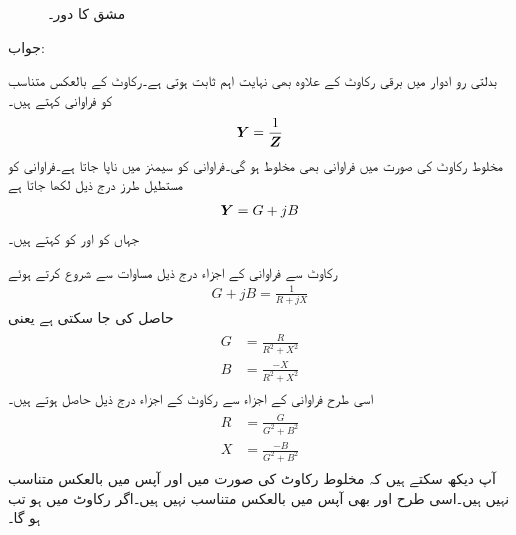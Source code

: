 \begin{figure}
\centering
{}
\caption{مشق  کا دور۔}
\label{شکل_بدلتا_متوازی_الف}
\end{figure} 

جواب:

بدلتی رو ادوار میں برقی رکاوٹ  کے علاوہ   بھی نہایت اہم ثابت ہوتی ہے۔رکاوٹ کے بالعکس متناسب کو فراوانی کہتے ہیں۔
\begin{align}
{\ensuremath{{\boldsymbol{Y}}}}=\frac{1}{{{\boldsymbol{Z}}}}
\end{align}
مخلوط رکاوٹ کی صورت میں فراوانی بھی مخلوط ہو گی۔فراوانی کو سیمنز  میں ناپا جاتا ہے۔فراوانی کو مستطیل طرز درج ذیل لکھا جاتا ہے
\begin{align}
{\ensuremath{{\boldsymbol{Y}}}}=G+jB
\end{align}
جہاں  کو  اور  کو  کہتے ہیں۔

رکاوٹ سے فراوانی کے اجزاء درج ذیل مساوات سے شروع کرتے ہوئے
\begin{align}
G+jB=\frac{1}{R+jX}
\end{align}
حاصل کی جا سکتی ہے یعنی
\begin{gather}
\begin{aligned}
G&=\frac{R}{R^2+X^2}\\
B&=\frac{-X}{R^2+X^2}
\end{aligned}
\end{gather}
اسی طرح فراوانی کے اجزاء سے رکاوٹ کے اجزاء درج ذیل حاصل ہوتے ہیں۔
\begin{gather}
\begin{aligned}
R&=\frac{G}{G^2+B^2}\\
X&=\frac{-B}{G^2+B^2}
\end{aligned}
\end{gather}
آپ دیکھ سکتے ہیں کہ مخلوط رکاوٹ کی صورت میں  اور  آپس میں بالعکس متناسب نہیں ہیں۔اسی طرح  اور  بھی آپس میں بالعکس متناسب نہیں ہیں۔اگر رکاوٹ میں  ہو تب  ہو گا۔

